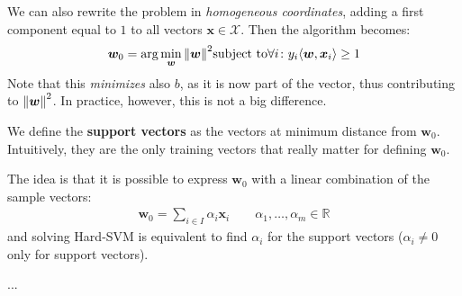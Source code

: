 \documentclass[../template.tex]{subfiles}
\begin{document}
We can also rewrite the problem in \textit{homogeneous coordinates}, adding a first component equal to $1$ to all vectors $\bm{x} \in \mathcal{X}$. Then the algorithm becomes:
\begin{align*}
    \bm{w}_0 = \arg\min_{\bm{w}} \norm{\bm{w}}^2 \mathrm{subject\ to } \forall i\colon y_i \langle \bm{w}, \bm{x}_i \rangle \geq 1
\end{align*}    
Note that this \textit{minimizes} also $b$, as it is now part of the vector, thus contributing to $\norm{\bm{w}}^2$. In practice, however, this is not a big difference. 

We define the \textbf{support vectors} as the vectors at minimum distance from $\bm{w}_0$. Intuitively, they are the only training vectors that really matter for defining $\bm{w}_0$. 

The idea is that it is possible to express $\bm{w}_0$ with a linear combination of the sample vectors:
\begin{align*}
    \bm{w}_0 = \sum_{i \in I} \alpha_i \bm{x}_i \qquad \alpha_1, \dots, \alpha_m \in \mathbb{R}
\end{align*} 
and solving Hard-SVM is equivalent to find $\alpha_i$ for the support vectors ($\alpha_i \neq 0$ only for support vectors). 

...
\end{document}

